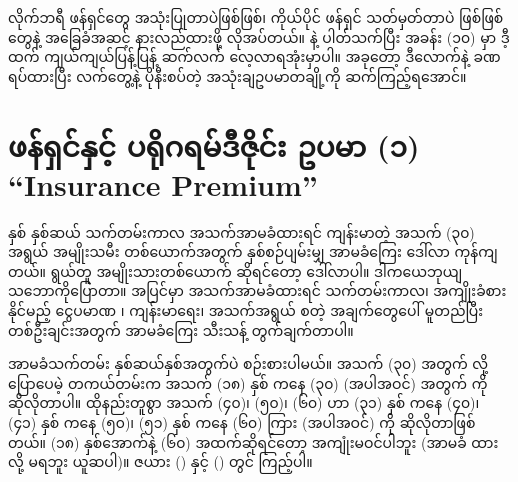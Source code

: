 လိုက်ဘရီ ဖန်ရှင်တွေ အသုံးပြုတာပဲဖြစ်ဖြစ်၊ ကိုယ်ပိုင် ဖန်ရှင် သတ်မှတ်တာပဲ ဖြစ်ဖြစ်  တွေနဲ့   အခြေခံအဆင့် နားလည်ထားဖို့ လိုအပ်တယ်။  နဲ့ ပါတ်သက်ပြီး အခန်း (၁၀)  မှာ ဒီ့ထက် ကျယ်ကျယ်ပြန့်ပြန့် ဆက်လက် လေ့လာရအုံးမှာပါ။  အခုတော့ ဒီလောက်နဲ့ ခဏရပ်ထားပြီး လက်တွေ့နဲ့ ပိုနီးစပ်တဲ့  အသုံးချဥပမာတချို့ကို ဆက်ကြည့်ရအောင်။

\section{ဖန်ရှင်နှင့် ပရိုဂရမ်ဒီဇိုင်း ဥပမာ (၁) “Insurance Premium”}
နှစ် နှစ်ဆယ် သက်တမ်းကာလ  အသက်အာမခံထားရင် ကျန်းမာတဲ့ အသက် (၃၀) အရွယ် အမျိုးသမီး တစ်ယောက်အတွက် နှစ်စဉ်ပျမ်းမျှ အာမခံကြေး   ဒေါ်လာ ကုန်ကျတယ်။ ရွယ်တူ အမျိုးသားတစ်ယောက် ဆိုရင်တော့  ဒေါ်လာပါ။ ဒါကယေဘုယျ သဘောကိုပြောတာ။ အပြင်မှာ အသက်အာမခံထားရင် သက်\allowbreak တမ်းကာလ၊ အကျိုးခံစားနိုင်မည့် ငွေပမာဏ ၊ ကျန်းမာရေး၊ အသက်အရွယ်  စတဲ့ အချက်တွေပေါ် မူတည်ပြီး တစ်ဦးချင်းအတွက် အာမခံကြေး သီးသန့် တွက်ချက်တာပါ။

အာမခံသက်တမ်း နှစ်ဆယ်နှစ်အတွက်ပဲ စဉ်းစားပါမယ်။ အသက် (၃၀) အတွက်  လို့ပြောပေမဲ့ တကယ်တမ်းက အသက် (၁၈) နှစ် ကနေ (၃၀) (အပါအဝင်) အတွက်  ကို ဆိုလိုတာပါ။ ထိုနည်းတူစွာ အသက် (၄၀)၊ (၅၀)၊ (၆၀)  ဟာ (၃၁) နှစ် ကနေ (၄၀)၊ (၄၁) နှစ် ကနေ (၅၀)၊ (၅၁) နှစ် ကနေ (၆၀) ကြား (အပါအဝင်) ကို ဆိုလိုတာဖြစ်တယ်။ (၁၈) နှစ်အောက်နဲ့ (၆၀) အထက်ဆိုရင်တော့ အကျုံးမဝင်ပါဘူး (အာမခံ ထားလို့ မရဘူး ယူဆပါ)။ ဇယား (\fRefNo{\ref{tbl:premiumF}}) နှင့် (\fRefNo{\ref{tbl:premiumM}}) တွင် ကြည့်ပါ။

